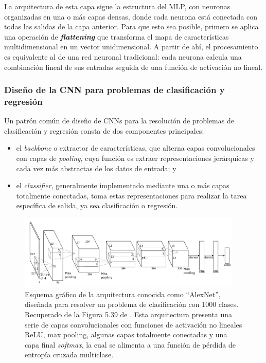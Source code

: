 La arquitectura de esta capa sigue la estructura del MLP, con neuronas organizadas en una o más capas densas, 
donde cada neurona está conectada con todas las salidas de la capa anterior. Para que esto sea posible, 
primero se aplica una operación de \textbf{\textit{flattening}} que transforma el mapa de características 
multidimensional en un vector unidimensional. A partir de ahí, el procesamiento es equivalente al de una red 
neuronal tradicional: cada neurona calcula una combinación lineal de sus entradas seguida de una función de 
activación no lineal.


\subsubsection{Diseño de la CNN para problemas de clasificación y regresión}

Un patrón común de diseño de CNNs para la resolución de problemas de clasificación y regresión consta de dos
componentes principales:

\begin{itemize}

    \item el \textit{backbone} o extractor de características, que alterna capas convolucionales con capas de
    \textit{pooling}, cuya función es extraer representaciones jerárquicas y cada vez más abstractas de los 
    datos de entrada; y

    \item el \textit{classifier}, generalmente implementado mediante una o más capas totalmente conectadas, 
    toma estas representaciones para realizar la tarea específica de salida, ya sea clasificación o regresión.

\end{itemize}


\begin{figure}[h]
    \centering
    \includegraphics[width=0.95\textwidth]{capitulos/cap_02/imagenes/CNN_complete.png}
    \caption{
        Esquema gráfico de la arquitectura conocida como ``AlexNet'', diseñada para resolver un problema
        de clasificación con 1000 clases.
        Recuperado de la Figura 5.39 de \cite{szeliski2010}.
        Esta arquitectura presenta una serie de capas convolucionales con funciones de activación no lineales 
        ReLU, max pooling, algunas capas totalmente conectadas y una capa final \textit{softmax}, la cual se 
        alimenta a una función de pérdida de entropía cruzada multiclase.
    } 
    \label{fig:CNN_complete}
\end{figure}


